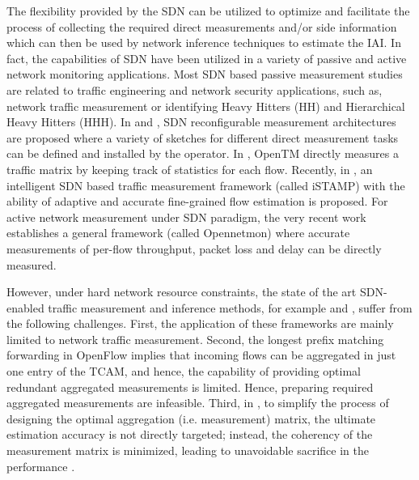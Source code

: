 The flexibility provided by the SDN can be utilized to optimize and facilitate the process of collecting the required direct measurements and/or side information which can then be used by network inference techniques to estimate the IAI. In fact, the capabilities of SDN have been utilized in a variety of passive and active network monitoring applications. Most SDN based passive measurement studies are related to traffic engineering and network security applications, such as, network traffic measurement or identifying Heavy Hitters (HH) and Hierarchical Heavy Hitters (HHH). In \cite{MYu:2011} and \cite{MYu:2013}, SDN reconfigurable measurement architectures are proposed where a variety of sketches for different direct measurement tasks can be defined and installed by the operator. In \cite{Tootoonchian:2010}, OpenTM directly measures a traffic matrix by keeping track of statistics for each flow. Recently, in \cite{IF14iSTAMP:2014}, an intelligent SDN based traffic measurement framework (called iSTAMP) with the ability of adaptive and accurate fine-grained flow estimation is proposed. For active network measurement under SDN paradigm, the very recent work \cite{Adrichen:2014} establishes a general framework (called Opennetmon) where accurate measurements of per-flow throughput, packet loss and delay can be directly measured.

However, under hard network resource constraints, the state of the art SDN-enabled traffic measurement and inference methods, for example \cite{MYu:2013} and \cite{IF14iSTAMP:2014}, suffer from the following challenges. First, the application of these frameworks are mainly limited to network traffic measurement. Second, the longest prefix matching forwarding in OpenFlow implies that incoming flows can be aggregated in just one entry of the TCAM, and hence, the capability of providing optimal redundant aggregated measurements is limited. Hence, preparing required aggregated measurements are infeasible. Third, in \cite{IF14iSTAMP:2014}, to simplify the process of designing the optimal aggregation (i.e. measurement) matrix, the ultimate estimation accuracy is not directly targeted; instead, the coherency of the measurement matrix is minimized, leading to unavoidable sacrifice in the performance \cite{IF14iSTAMP:2014}\cite{Elad:2007}.  

